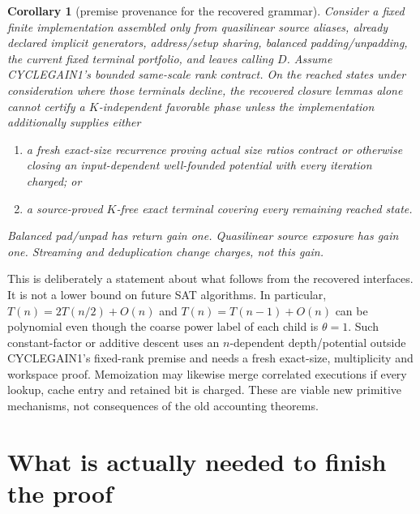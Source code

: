 \documentclass[11pt]{article}
\newtheorem{corollary}[theorem]{Corollary}
\begin{document}
\begin{corollary}[premise provenance for the recovered grammar]
Consider a fixed finite implementation assembled only from quasilinear
source aliases, already declared implicit generators, address/setup sharing,
balanced padding/unpadding, the current fixed terminal portfolio, and leaves
calling $D$.  Assume CYCLEGAIN1's bounded same-scale rank contract.  On the
reached states under consideration where those terminals decline, the
recovered closure lemmas alone cannot certify a $K$-independent favorable
phase unless the
implementation additionally supplies either
\begin{enumerate}
 \item a fresh exact-size recurrence proving actual size ratios contract or
 otherwise closing an input-dependent well-founded potential with every
 iteration charged; or
 \item a source-proved $K$-free exact terminal covering every remaining
 reached state.
\end{enumerate}
Balanced pad/unpad has return gain one.  Quasilinear source exposure has
gain one.  Streaming and deduplication change charges, not this gain.
\end{corollary}

This is deliberately a statement about what follows from the recovered
interfaces.  It is not a lower bound on future SAT algorithms.  In
particular, $T(n)=2T(n/2)+O(n)$ and $T(n)=T(n-1)+O(n)$ can be polynomial even
though the coarse power label of each child is $\theta=1$.  Such
constant-factor or additive descent uses an $n$-dependent depth/potential
outside CYCLEGAIN1's fixed-rank premise and needs a fresh exact-size,
multiplicity and workspace proof.  Memoization may likewise merge correlated
executions if every lookup, cache entry and retained bit is charged.  These
are viable new primitive mechanisms, not consequences of the old accounting
theorems.

\section{What is actually needed to finish the proof}
\end{document}
